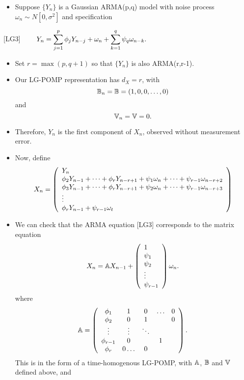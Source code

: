 \documentclass[]{article}
\providecommand{\tightlist}{%
  \setlength{\itemsep}{0pt}\setlength{\parskip}{0pt}}
\begin{document}
\begin{itemize}
\tightlist
\item
  Suppose \(\{Y_n\}\) is a Gaussian ARMA(p,q) model with noise process
  \(\omega_n\sim N[0,\sigma^2]\) and specification
\end{itemize}

{[}LG3{]}
\(\quad\quad\displaystyle Y_n = \sum_{j=1}^p \phi_j Y_{n-j} + \omega_n + \sum_{k=1}^q \psi_q \omega_{n-k}.\)

\begin{itemize}
\item
  Set \(r=\max(p,q+1)\) so that \(\{Y_n\}\) is also ARMA(r,r-1).
\item
  Our LG-POMP representation has \(d_X=r\), with
  \[\mathbb{B}_n = \mathbb{B} = (1,0,0,\dots,0)\] and
  \[\mathbb{V}_n = \mathbb{V} = 0.\]
\item
  Therefore, \(Y_n\) is the first component of \(X_n\), observed without
  measurement error.
\item
  Now, define \[ X_n = \left(\begin{array}{l}
  Y_n \\
  \phi_2 Y_{n-1} + \dots + \phi_r Y_{n-r+1} + \psi_1 \omega_n + \dots +\psi_{r-1} \omega_{n-r+2}
  \\
  \phi_3 Y_{n-1} + \dots + \phi_r Y_{n-r+1} + \psi_2 \omega_n + \dots +\psi_{r-1} \omega_{n-r+3}
  \\
  \vdots
  \\
  \phi_r Y_{n-1} + \psi_{r-1} \omega_t
  \end{array}\right)\]
\item
  We can check that the ARMA equation {[}LG3{]} corresponds to the
  matrix equation \[ X_{n} = \mathbb{A} X_{n-1} + \left(\begin{array}{l}
  1 \\
  \psi_1\\
  \psi_2\\
  \vdots\\
  \psi_{r-1}
  \end{array}\right) \omega_n.
  \] where \[
  \mathbb{A} = 
  \left(\begin{array}{ccccc}
  \phi_1 & 1 & 0 & \ldots & 0 \\
  \phi_2 & 0 & 1 &       & 0 \\
  \vdots & \vdots& \ddots & \\
  \phi_{r-1} & 0 & & 1 \\
  \phi_{r} & 0 \ldots & 0
  \end{array}\right).\] This is in the form of a time-homogenous
  LG-POMP, with \(\mathbb{A}\), \(\mathbb{B}\) and \(\mathbb{V}\) defined above, and

\end{itemize}
\end{document}
